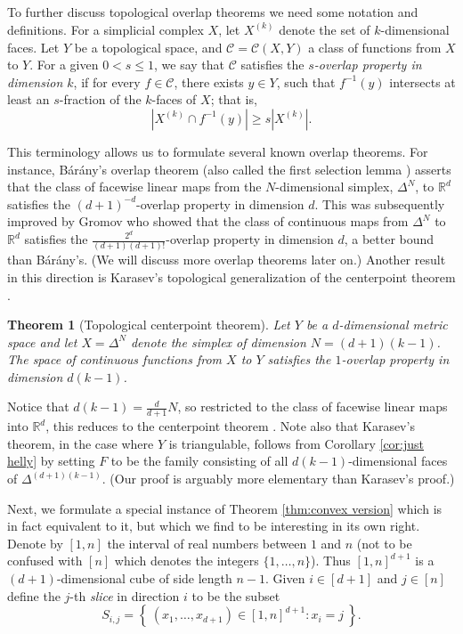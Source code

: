\documentclass[12pt,a4paper,oneside]{amsart}\sloppy
\newtheorem*{theorem*}{Theorem}
\theoremstyle{definition}
\newcommand{\slice}[2]{S_{#1,#2} }
\newcommand{\faces}[2]{{#1}^{(#2)}}
\begin{document}
\subsection{}
To further discuss topological overlap theorems we need some notation and definitions. For a simplicial complex $X$, let $\faces{X}{k}$ denote the set of
$k$-dimensional faces. Let $Y$ be a topological space, and $\mathcal{C}=\mathcal{C}(X,Y)$ a class of functions from $X$ to $Y$.  For a given $0 < s \leq 1$, we say that $\mathcal{C}$ satisfies the \emph{$s$-overlap property in dimension $k$}, if for every $f \in \mathcal{C}$, there exists $y \in Y$, such that $f^{-1}(y)$ intersects at least an $s$-fraction of the $k$-faces of $X$; that is, \[|\faces{X}{k} \cap f^{-1}(y)| \geq s |\faces{X}{k}|.\]

This terminology allows us to formulate several known overlap theorems. For instance, B{\'a}r{\'a}ny's overlap theorem (also called the first selection lemma \cite[Theorem 9.1.1]{Matousek2002}) asserts that the class of facewise linear maps from the $N$-dimensional simplex, $\Delta^N$, to $\mathbb{R}^d$ satisfies the $(d+1)^{-d}$-overlap property in dimension $d$. This was subsequently improved by Gromov \cite{Gromov2010} who showed that the class of continuous maps from $\Delta^N$ to $\mathbb{R}^d$ satisfies the $\frac{2^d}{(d+1)(d+1)!}$-overlap property in dimension $d$, a better bound than B{\'a}r{\'a}ny's. (We will discuss more overlap theorems later on.) Another result in this direction is 
Karasev's topological generalization of the centerpoint theorem \cite{roman-central}.

\begin{theorem*}[Topological centerpoint theorem]
Let $Y$ be a $d$-dimensional metric space and let $X=\Delta^N$ denote the simplex of dimension $N = (d+1)(k-1)$. The space of continuous functions from $X$ to $Y$ satisfies the $1$-overlap property in dimension $d(k-1)$.
\end{theorem*}
Notice that $d(k-1)=\frac{d}{d+1} N$, so restricted to the class of facewise linear maps into $\mathbb{R}^d$, this reduces to the centerpoint theorem \cite{Rado1946}. Note also that Karasev's theorem, in the case where $Y$ is triangulable, follows from Corollary \ref{cor:just helly} by setting $F$ to be the family consisting of all $d(k-1)$-dimensional faces of $\Delta^{(d+1)(k-1)}$. (Our proof is arguably more elementary than Karasev's proof.)

Next, we formulate a special instance of Theorem \ref{thm:convex version} which is in fact equivalent to it, but which we find to be interesting in its own right. 
Denote by $[1,n]$ the interval of real numbers between $1$ and $n$ (not to be confused with $[n]$ which denotes the integers $\{1, \dots, n\}$). Thus $[1,n]^{d+1}$ is a $(d+1)$-dimensional cube of side length $n-1$. Given $i \in [d+1]$ and $j \in [n]$ define the $j$-th \emph{slice} in direction $i$ to be the subset
\[ \slice{i}{j} = \left\{ \: (x_1, \dots, x_{d+1}) \in [1,n]^{d+1}  :  x_i = j \:\right\}. \]
\end{document}
